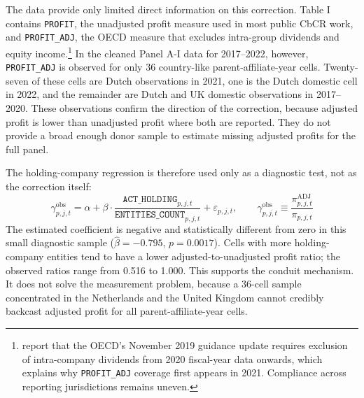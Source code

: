\documentclass[11pt,a4paper]{article}
\newcommand{\code}[1]{\texttt{#1}}
\begin{document}
The data provide only limited direct information on this correction. Table I contains \code{PROFIT}, the unadjusted profit measure used in most public CbCR work, and \code{PROFIT\_ADJ}, the OECD measure that excludes intra-group dividends and equity income.\footnote{\citet{boukal2026} report that the OECD's November 2019 guidance update requires exclusion of intra-company dividends from 2020 fiscal-year data onwards, which explains why \code{PROFIT\_ADJ} coverage first appears in 2021. Compliance across reporting jurisdictions remains uneven.} In the cleaned Panel A-I data for 2017--2022, however, \code{PROFIT\_ADJ} is observed for only 36 country-like parent-affiliate-year cells. Twenty-seven of these cells are Dutch observations in 2021, one is the Dutch domestic cell in 2022, and the remainder are Dutch and UK domestic observations in 2017--2020. These observations confirm the direction of the correction, because adjusted profit is lower than unadjusted profit where both are reported. They do not provide a broad enough donor sample to estimate missing adjusted profits for the full panel.

The holding-company regression is therefore used only as a diagnostic test, not as the correction itself:
\begin{equation}\label{eq:correction_model}
\gamma_{p,j,t}^{\text{obs}} = \alpha + \beta \cdot \frac{\code{ACT\_HOLDING}_{p,j,t}}{\code{ENTITIES\_COUNT}_{p,j,t}} + \varepsilon_{p,j,t}, \qquad \gamma_{p,j,t}^{\text{obs}} \equiv \frac{\pi_{p,j,t}^{\text{ADJ}}}{\pi_{p,j,t}}
\end{equation}
The estimated coefficient is negative and statistically different from zero in this small diagnostic sample ($\hat{\beta}=-0.795$, $p=0.0017$). Cells with more holding-company entities tend to have a lower adjusted-to-unadjusted profit ratio; the observed ratios range from 0.516 to 1.000. This supports the conduit mechanism. It does not solve the measurement problem, because a 36-cell sample concentrated in the Netherlands and the United Kingdom cannot credibly backcast adjusted profit for all parent-affiliate-year cells.
\end{document}
